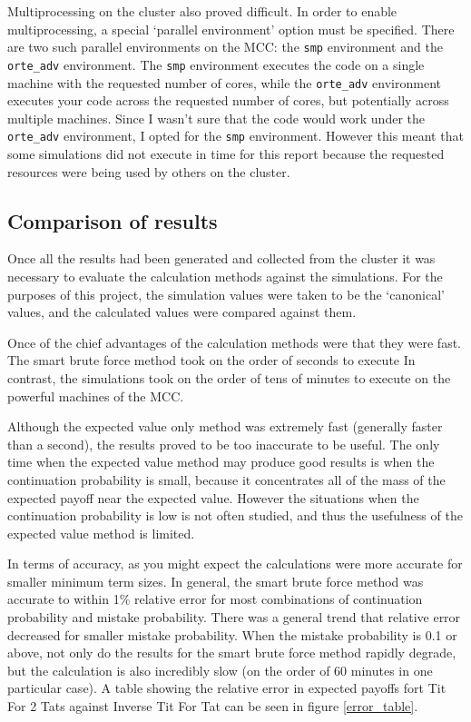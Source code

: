\documentclass[a4paper,12pt]{article}
\begin{document}
Multiprocessing on the cluster also proved difficult.
In order to enable multiprocessing, a special `parallel environment' option must be specified.
There are two such parallel environments on the MCC: the \texttt{smp} environment and the \texttt{orte\_adv} environment.
The \texttt{smp} environment executes the code on a single machine with the requested number of cores, while the \texttt{orte\_adv} environment executes your code across the requested number of cores, but potentially across multiple machines.
Since I wasn't sure that the code would work under the \texttt{orte\_adv} environment, I opted for the \texttt{smp} environment.
However this meant that some simulations did not execute in time for this report because the requested resources were being used by others on the cluster.

\subsection{Comparison of results}

Once all the results had been generated and collected from the cluster it was necessary to evaluate the calculation methods against the simulations.
For the purposes of this project, the simulation values were taken to be the `canonical' values, and the calculated values were compared against them.

Once of the chief advantages of the calculation methods were that they were fast.
The smart brute force method took on the order of seconds to execute
In contrast, the simulations took on the order of tens of minutes to execute on the powerful machines of the MCC.

Although the expected value only method was extremely fast (generally faster than a second), the results proved to be too inaccurate to be useful.
The only time when the expected value method may produce good results is when the continuation probability is small, because it concentrates all of the mass of the expected payoff near the expected value.
However the situations when the continuation probability is low is not often studied, and thus the usefulness of the expected value method is limited.

In terms of accuracy, as you might expect the calculations were more accurate for smaller minimum term sizes.
In general, the smart brute force method was accurate to within 1\% relative error for most combinations of continuation probability and mistake probability.
There was a general trend that relative error decreased for smaller mistake probability.
When the mistake probability is 0.1 or above, not only do the results for the smart brute force method rapidly degrade, but the calculation is also incredibly slow (on the order of 60 minutes in one particular case).
A table showing the relative error in expected payoffs fort Tit For 2 Tats against Inverse Tit For Tat can be seen in figure \ref{error_table}.
\end{document}

